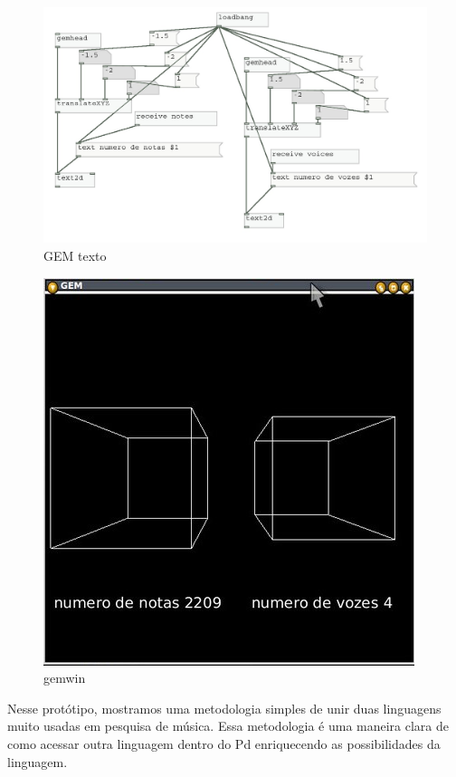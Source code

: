 \documentclass{ppgmus}
\begin{document}
\begin{figure}
\includegraphics[scale=.5]{gemtexto00}
\caption{GEM texto}
\label{GEM texto}
\end{figure} 



\begin{figure}
\includegraphics[scale=.5]{gemwin}
\caption{gemwin}
\label{gemwin}
\end{figure} 



  Nesse protótipo, mostramos uma metodologia
simples de unir duas linguagens muito usadas em pesquisa de música.
Essa metodologia é uma maneira clara de como acessar outra linguagem dentro do Pd
enriquecendo as possibilidades da linguagem.
\end{document}
